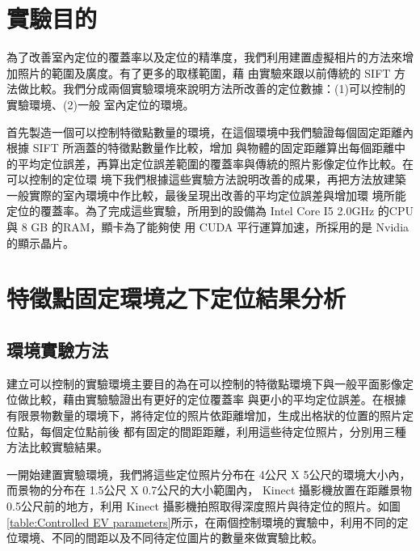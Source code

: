 

\section{實驗目的}
	
	為了改善室內定位的覆蓋率以及定位的精準度，我們利用建置虛擬相片的方法來增加照片的範圍及廣度。有了更多的取樣範圍，藉
由實驗來跟以前傳統的 SIFT 方法做比較。我們分成兩個實驗環境來說明方法所改善的定位數據：(1)可以控制的實驗環境、(2)一般
室內定位的環境。

	首先製造一個可以控制特徵點數量的環境，在這個環境中我們驗證每個固定距離內根據 SIFT 所涵蓋的特徵點數量作比較，增加
與物體的固定距離算出每個距離中的平均定位誤差，再算出定位誤差範圍的覆蓋率與傳統的照片影像定位作比較。在可以控制的定位環
境下我們根據這些實驗方法說明改善的成果，再把方法放建築一般實際的室內環境中作比較，最後呈現出改善的平均定位誤差與增加環
境所能定位的覆蓋率。為了完成這些實驗，所用到的設備為  Intel Core I5 2.0GHz 的CPU與 8 GB 的RAM，顯卡為了能夠使
用 CUDA 平行運算加速，所採用的是 Nvidia 的顯示晶片。

\section{特徵點固定環境之下定位結果分析}


\subsection{環境實驗方法}
	建立可以控制的實驗環境主要目的為在可以控制的特徵點環境下與一般平面影像定位做比較，藉由實驗驗證出有更好的定位覆蓋率
與更小的平均定位誤差。在根據有限景物數量的環境下，將待定位的照片依距離增加，生成出格狀的位置的照片定位點，每個定位點前後
都有固定的間距距離，利用這些待定位照片，分別用三種方法比較實驗結果。

	一開始建置實驗環境，我們將這些定位照片分布在 4公尺 X 5公尺的環境大小內，而景物的分布在 1.5公尺 X 0.7公尺的大小範圍內， 
Kinect 攝影機放置在距離景物 0.5公尺前的地方，利用 Kinect 攝影機拍照取得深度照片與待定位的照片。如圖\ref{table:Controlled 
EV parameters}所示，在兩個控制環境的實驗中，利用不同的定位環境、不同的間距以及不同待定位圖片的數量來做實驗比較。
		
		
		
